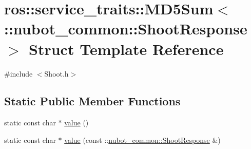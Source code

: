\hypertarget{structros_1_1service__traits_1_1MD5Sum_3_01_1_1nubot__common_1_1ShootResponse_01_4}{\section{ros\-:\-:service\-\_\-traits\-:\-:M\-D5\-Sum$<$ \-:\-:nubot\-\_\-common\-:\-:Shoot\-Response $>$ Struct Template Reference}
\label{structros_1_1service__traits_1_1MD5Sum_3_01_1_1nubot__common_1_1ShootResponse_01_4}
}


{\ttfamily \#include $<$Shoot.\-h$>$}

\subsection*{Static Public Member Functions}
\begin{DoxyCompactItemize}
\item 
static const char $\ast$ \hyperlink{structros_1_1service__traits_1_1MD5Sum_3_01_1_1nubot__common_1_1ShootResponse_01_4_a39b1bfec7eb80f3db2843fcbab713f73}{value} ()
\item 
static const char $\ast$ \hyperlink{structros_1_1service__traits_1_1MD5Sum_3_01_1_1nubot__common_1_1ShootResponse_01_4_a08d8cc264b99166140ff32a1e8aba252}{value} (const \-::\hyperlink{namespacenubot__common_a1561f4f368f1842d112eda1c185772d4}{nubot\-\_\-common\-::\-Shoot\-Response} \&)
\end{DoxyCompactItemize}


